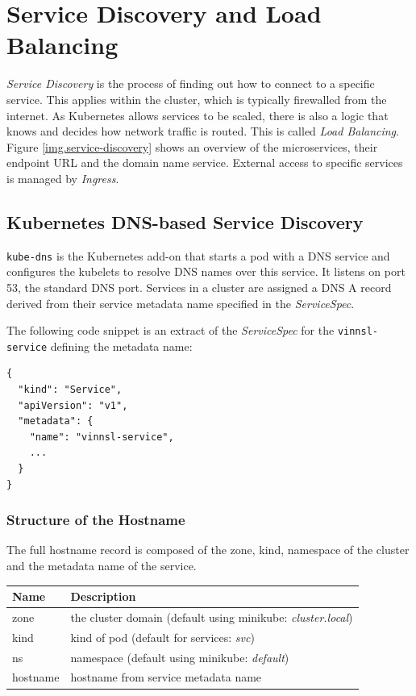 \section{Service Discovery and Load
Balancing}\label{service-discovery-and-load-balancing}

\emph{Service Discovery} is the process of finding out how to connect to
a specific service. This applies within the cluster, which is typically
firewalled from the internet. As Kubernetes allows services to be
scaled, there is also a logic that knows and decides how network traffic
is routed. This is called \emph{Load Balancing}. Figure
\ref{img.service-discovery} shows an overview of the microservices,
their endpoint URL and the domain name service. External access to
specific services is managed by \emph{Ingress}.

\subsection{Kubernetes DNS-based Service
Discovery}\label{kubernetes-dns-based-service-discovery}

\texttt{kube-dns} is the Kubernetes add-on that starts a pod with a DNS
service and configures the kubelets to resolve DNS names over this
service. It listens on port 53, the standard DNS port. Services in a
cluster are assigned a DNS A record derived from their service metadata
name specified in the \emph{ServiceSpec}. \cite{kub-dns-spec}

The following code snippet is an extract of the \emph{ServiceSpec} for
the \texttt{vinnsl-service} defining the metadata name:

\begin{verbatim}
{
  "kind": "Service",
  "apiVersion": "v1",
  "metadata": {
    "name": "vinnsl-service",
    ...
  }
}
\end{verbatim}

\subsubsection{Structure of the
Hostname}\label{structure-of-the-hostname}

The full hostname record is composed of the zone, kind, namespace of the
cluster and the metadata name of the service.

\begin{longtable}[]{@{}ll@{}}
\toprule
Name & Description\tabularnewline
\midrule
\endhead
zone & the cluster domain (default using minikube:
\emph{cluster.local})\tabularnewline
kind & kind of pod (default for services: \emph{svc})\tabularnewline
ns & namespace (default using minikube: \emph{default})\tabularnewline
hostname & hostname from service metadata name\tabularnewline
\bottomrule
\end{longtable}

